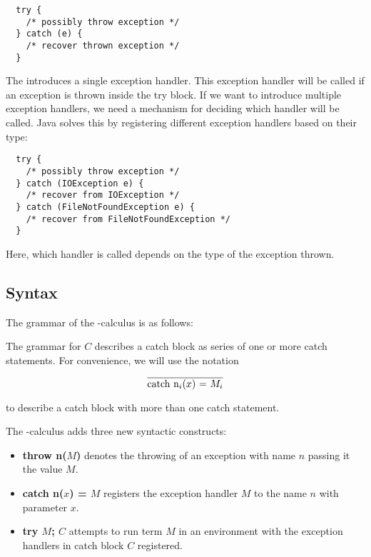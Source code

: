 \begin{Verbatim}
  try {
    /* possibly throw exception */
  } catch (e) {
    /* recover thrown exception */ 
  }
\end{Verbatim}

The  introduces a single exception handler.
This exception handler will be called if an exception is thrown inside the try block.
If we want to introduce multiple exception handlers,
we need a mechanism for deciding which handler will be called.
Java solves this by registering different exception handlers based on their type:

\begin{Verbatim}
  try {
    /* possibly throw exception */
  } catch (IOException e) {
    /* recover from IOException */  
  } catch (FileNotFoundException e) {
    /* recover from FileNotFoundException */ 
  }
\end{Verbatim}

Here, which handler is called depends on the type of the exception thrown.

\subsection{Syntax}

The grammar of the \ltry-calculus is as follows:

The grammar for $C$ describes a catch block as series of one or more catch statements. 
For convenience, we will use the notation 

\[
  \overline{\text{catch n$_i$($x$) = $M_i$}}
\]

to describe a catch block with more than one catch statement. 

The \ltry-calculus adds three new syntactic constructs:
\begin{itemize}
\item \textbf{throw n($M$)} denotes the throwing of an exception with name $n$ passing it the value $M$.
\item \textbf{catch n($x$) = $M$} registers the exception handler $M$ to the name $n$ with parameter $x$.
\item \textbf{try $M$; $C$} attempts to run term $M$ in an environment with the exception handlers in catch block $C$ registered.
\end{itemize}

